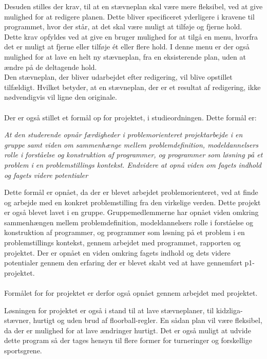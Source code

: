 Desuden stilles der krav, til at en stævneplan skal være mere fleksibel, ved at give mulighed for at redigere planen. Dette bliver specificeret yderligere i kravene til programmet, hvor der står, at det skal være muligt at tilføje og fjerne hold.\\
Dette krav opfyldes ved at give en bruger mulighed for at tilgå en menu, hvorfra det er muligt at fjerne eller tilføje ét eller flere hold. I denne menu er der også mulighed for at lave en helt ny stævneplan, fra en eksisterende plan, uden at ændre på de deltagende hold.
\\
Den stævneplan, der bliver udarbejdet efter redigering, vil blive opstillet tilfældigt. Hvilket betyder, at en stævneplan, der er et resultat af redigering, ikke nødvendigvis vil ligne den originale.
\\\\
Der er også stillet et formål op for projektet, i studieordningen. Dette formål er: 
\par
\textit{At den studerende opnår færdigheder i problemorienteret projektarbejde i en gruppe samt viden om sammenhænge mellem problemdefinition, modeldannelsers rolle i forståelse og konstruktion af programmer, og programmer som løsning på et problem i en problemstillings kontekst. Endvidere at opnå viden om fagets indhold og fagets videre potentialer} \citep{studieordning}
\par
Dette formål er opnået, da der er blevet arbejdet problemorienteret, ved at finde og arbejde med en konkret problemstilling fra den virkelige verden. Dette projekt er også blevet lavet i en gruppe. Gruppemedlemmerne har opnået viden omkring sammenhængen mellem problemdefinition, modeldannelsers rolle i forståelse og konstruktion af programmer, og programmer som løsning på et problem i en problemstillings kontekst, gennem arbejdet med programmet, rapporten og projektet. Der er opnået en viden omkring fagets indhold og dets videre potentialer gennem den erfaring der er blevet skabt ved at have gennemført p1-projektet. 
\\\\
Formålet for for projektet er derfor også opnået gennem arbejdet med projektet.
\par
Løsningen for projektet er også i stand til at lave stævneplaner, til kidzliga-stævner, hurtigt og uden brud af floorball-regler. En sådan plan vil være fleksibel, da der er mulighed for at lave ændringer hurtigt. Det er også muligt at udvide dette program så der tages hensyn til flere former for turneringer og forskellige sportsgrene.


